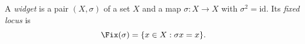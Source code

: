 
\begin{definition}[Widget]\label{dm-0001}\label{def:widget}
A \emph{widget} is a pair $(X,\sigma)$ of a set $X$ and a map $\sigma\colon X\to X$ with $\sigma^2=\mathrm{id}$. Its \emph{fixed locus} is
\begin{equation}\label{eq:fix}
\Fix(\sigma) = \{x\in X : \sigma x = x\}.
\end{equation}
\end{definition}
